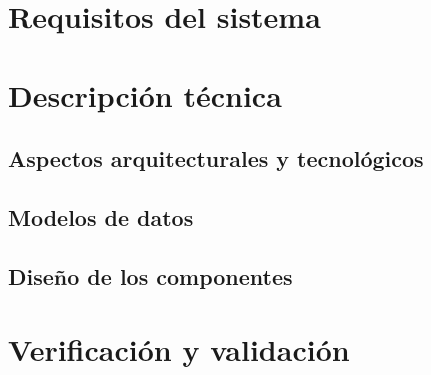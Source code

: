 \documentclass[10pt,spanish]{article}
\let\stdsection\section
\renewcommand\section{\newpage\stdsection}
\begin{document}
\section{Requisitos del sistema}



\section{Descripción técnica}


\subsection{Aspectos arquitecturales y tecnológicos}


\subsection{Modelos de datos}


\subsection{Diseño de los componentes}



\section{Verificación y validación}

\end{document}
